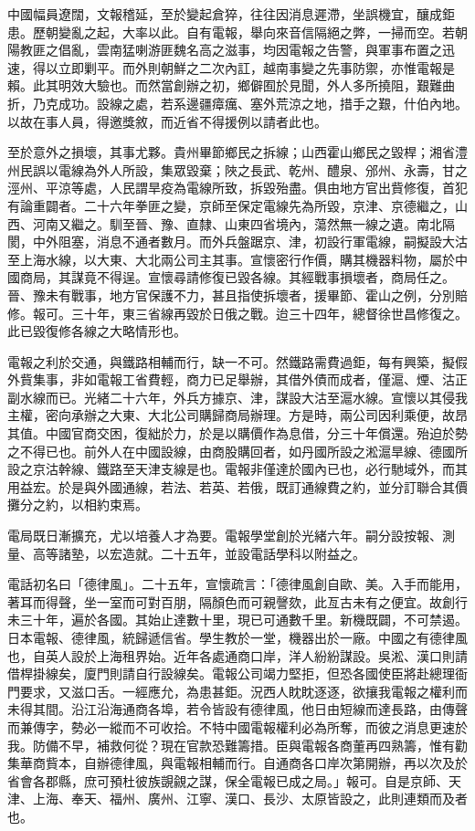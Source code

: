 \begin{pinyinscope}
中國幅員遼闊，文報稽延，至於變起倉猝，往往因消息遲滯，坐誤機宜，釀成鉅患。歷朝變亂之起，大率以此。自有電報，舉向來音信隔絕之弊，一掃而空。若朝陽教匪之倡亂，雲南猛喇游匪魏名高之滋事，均因電報之告警，與軍事布置之迅速，得以立即剿平。而外則朝鮮之二次內訌，越南事變之先事防禦，亦惟電報是賴。此其明效大驗也。而然當創辦之初，鄉僻囿於見聞，外人多所撓阻，艱難曲折，乃克成功。設線之處，若系邊疆瘴癘、塞外荒涼之地，措手之艱，什伯內地。以故在事人員，得邀獎敘，而近省不得援例以請者此也。

至於意外之損壞，其事尤夥。貴州畢節鄉民之拆線；山西霍山鄉民之毀桿；湘省澧州民誤以電線為外人所設，集眾毀棄；陜之長武、乾州、醴泉、邠州、永壽，甘之涇州、平涼等處，人民謂旱疫為電線所致，拆毀殆盡。俱由地方官出貲修復，首犯有論重闢者。二十六年拳匪之變，京師至保定電線先為所毀，京津、京德繼之，山西、河南又繼之。馴至晉、豫、直隸、山東四省境內，蕩然無一線之遺。南北隔閡，中外阻塞，消息不通者數月。而外兵盤踞京、津，初設行軍電線，嗣擬設大沽至上海水線，以大東、大北兩公司主其事。宣懷密行作價，購其機器料物，屬於中國商局，其謀竟不得逞。宣懷尋請修復已毀各線。其經戰事損壞者，商局任之。晉、豫未有戰事，地方官保護不力，甚且指使拆壞者，援畢節、霍山之例，分別賠修。報可。三十年，東三省線再毀於日俄之戰。迨三十四年，總督徐世昌修復之。此已毀復修各線之大略情形也。

電報之利於交通，與鐵路相輔而行，缺一不可。然鐵路需費過鉅，每有興築，擬假外貲集事，非如電報工省費輕，商力已足舉辦，其借外債而成者，僅滬、煙、沽正副水線而已。光緒二十六年，外兵方據京、津，謀設大沽至滬水線。宣懷以其侵我主權，密向承辦之大東、大北公司購歸商局辦理。方是時，兩公司因利乘便，故昂其值。中國官商交困，復絀於力，於是以購價作為息借，分三十年償還。殆迫於勢之不得已也。前外人在中國設線，由商股購回者，如丹國所設之淞滬旱線、德國所設之京沽幹線、鐵路至天津支線是也。電報非僅達於國內已也，必行馳域外，而其用益宏。於是與外國通線，若法、若英、若俄，既訂通線費之約，並分訂聯合其價攤分之約，以相約束焉。

電局既日漸擴充，尤以培養人才為要。電報學堂創於光緒六年。嗣分設按報、測量、高等諸塾，以宏造就。二十五年，並設電話學科以附益之。

電話初名曰「德律風」。二十五年，宣懷疏言：「德律風創自歐、美。入手而能用，著耳而得聲，坐一室而可對百朋，隔顏色而可親謦欬，此亙古未有之便宜。故創行未三十年，遍於各國。其始止達數十里，現已可通數千里。新機既闢，不可禁遏。日本電報、德律風，統歸遞信省。學生教於一堂，機器出於一廠。中國之有德律風也，自英人設於上海租界始。近年各處通商口岸，洋人紛紛謀設。吳淞、漢口則請借桿掛線矣，廈門則請自行設線矣。電報公司竭力堅拒，但恐各國使臣將赴總理衙門要求，又滋口舌。一經應允，為患甚鉅。況西人眈眈逐逐，欲攘我電報之權利而未得其間。沿江沿海通商各埠，若令皆設有德律風，他日由短線而達長路，由傳聲而兼傳字，勢必一縱而不可收拾。不特中國電報權利必為所奪，而彼之消息更速於我。防備不早，補救何從？現在官款恐難籌措。臣與電報各商董再四熟籌，惟有勸集華商貲本，自辦德律風，與電報相輔而行。自通商各口岸次第開辦，再以次及於省會各郡縣，庶可預杜彼族覬覦之謀，保全電報已成之局。」報可。自是京師、天津、上海、奉天、福州、廣州、江寧、漢口、長沙、太原皆設之，此則連類而及者也。


\end{pinyinscope}
